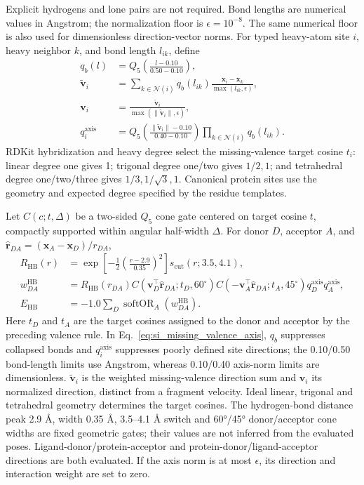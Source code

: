\documentclass{article}
\begin{document}
Explicit hydrogens and lone pairs are not required. Bond lengths are numerical values in Angstrom; the normalization floor is \(\epsilon=10^{-8}\). The same numerical floor is also used for dimensionless direction-vector norms.
For typed heavy-atom site \(i\), heavy neighbor \(k\), and bond length \(l_{ik}\), define
\begin{align}
    q_b(l)&=Q_5\left(\frac{l-0.10}{0.50-0.10}\right),\\
    \widetilde{\mathbf{v}}_i
    &=\sum_{k\in\mathcal{N}(i)}
      q_b(l_{ik})\frac{\mathbf{x}_i-\mathbf{x}_k}{\max(l_{ik},\epsilon)},\\
    \mathbf{v}_i&=
      \frac{\widetilde{\mathbf{v}}_i}
           {\max(\|\widetilde{\mathbf{v}}_i\|,\epsilon)},\\
    q_i^{\mathrm{axis}}
    &=Q_5\left(\frac{\|\widetilde{\mathbf{v}}_i\|-0.10}{0.40-0.10}\right)
      \prod_{k\in\mathcal{N}(i)}q_b(l_{ik}).
    \label{eq:si_missing_valence_axis}
\end{align}
RDKit hybridization and heavy degree select the missing-valence target cosine \(t_i\): linear degree one gives 1; trigonal degree one/two gives \(1/2,1\); and tetrahedral degree one/two/three gives \(1/3,1/\sqrt{3},1\).
Canonical protein sites use the geometry and expected degree specified by the residue templates.

Let \(C(c;t,\Delta)\) be a two-sided \(Q_5\) cone gate centered on target cosine \(t\), compactly supported within angular half-width \(\Delta\).
For donor \(D\), acceptor \(A\), and \(\widehat{\mathbf{r}}_{DA}=(\mathbf{x}_A-\mathbf{x}_D)/r_{DA}\),
\begin{align}
    R_{\mathrm{HB}}(r)
    &=\exp\left[-\frac{1}{2}
      \left(\frac{r-2.9}{0.35}\right)^2\right]s_{\mathrm{cut}}(r;3.5,4.1),\\
    w_{DA}^{\mathrm{HB}}
    &=R_{\mathrm{HB}}(r_{DA})
      C(\mathbf{v}_D^\top\widehat{\mathbf{r}}_{DA};t_D,60^\circ)
      C(-\mathbf{v}_A^\top\widehat{\mathbf{r}}_{DA};t_A,45^\circ)
      q_D^{\mathrm{axis}}q_A^{\mathrm{axis}},\\
    E_{\mathrm{HB}}
    &=-1.0\sum_D\operatorname{softOR}_A(w_{DA}^{\mathrm{HB}}).
    \label{eq:si_hydrogen_bond}
\end{align}
Here \(t_D\) and \(t_A\) are the target cosines assigned to the donor and acceptor by the preceding valence rule.
In Eq.~\eqref{eq:si_missing_valence_axis}, \(q_b\) suppresses collapsed bonds and \(q_i^{\mathrm{axis}}\) suppresses poorly defined site directions; the 0.10/0.50 bond-length limits use Angstrom, whereas 0.10/0.40 axis-norm limits are dimensionless. \(\widetilde{\mathbf v}_i\) is the weighted missing-valence direction sum and \(\mathbf v_i\) its normalized direction, distinct from a fragment velocity. Ideal linear, trigonal and tetrahedral geometry determines the target cosines. The hydrogen-bond distance peak 2.9 Å, width 0.35 Å, 3.5--4.1 Å switch and 60°/45° donor/acceptor cone widths are fixed geometric gates; their values are not inferred from the evaluated poses.
Ligand-donor/protein-acceptor and protein-donor/ligand-acceptor directions are both evaluated.
If the axis norm is at most \(\epsilon\), its direction and interaction weight are set to zero.
\end{document}
